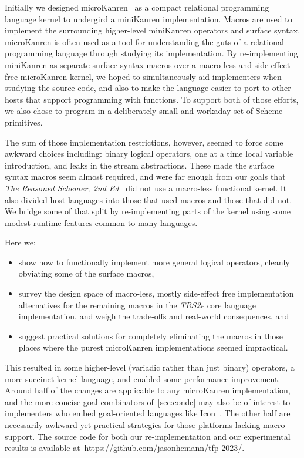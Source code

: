 \documentclass[sigplan,balance=true,pbalance=true,natbib=false]{acmart}
\begin{document}
Initially we designed microKanren~\cite{hemann2013muKanren} as a
compact relational programming language kernel to undergird a
miniKanren implementation. Macros are used to implement the
surrounding higher-level miniKanren operators and surface syntax.\@
microKanren is often used as a tool for understanding the guts of a
relational programming language through studying its implementation.
By re-implementing miniKanren as separate surface syntax macros over a
macro-less and side-effect free microKanren kernel, we hoped to
simultaneously aid implementers when studying the source code, and
also to make the language easier to port to other hosts that support
programming with functions. To support both of those efforts, we also
chose to program in a deliberately small and workaday set of Scheme
primitives.

The sum of those implementation restrictions, however, seemed to force
some awkward choices including: binary logical operators, one at a
time local variable introduction, and leaks in the stream
abstractions. These made the surface syntax macros seem almost
required, and were far enough from our goals that \emph{The Reasoned
  Schemer, 2nd Ed}~\cite{friedman2018reasoned} did not use a
macro-less functional kernel. It also divided host languages into
those that used macros and those that did not. We bridge some of that
split by re-implementing parts of the kernel using some modest runtime
features common to many languages.

Here we:
\begin{itemize}
\item show how to functionally implement more general logical
  operators, cleanly obviating some of the surface macros,

\item survey the design space of macro-less, mostly side-effect free
  implementation alternatives for the remaining macros in the
  \emph{TRS2e} core language implementation, and weigh the trade-offs
  and real-world consequences, and

\item suggest practical solutions for completely eliminating the
  macros in those places where the purest microKanren
  implementations seemed impractical.

\end{itemize}

This resulted in some higher-level (variadic rather than just binary)
operators, a more succinct kernel language, and enabled some
performance improvement. Around half of the changes are applicable to
any microKanren implementation, and the more concise goal combinators
of~\cref{sec:conde} may also be of interest to implementers who embed
goal-oriented languages like Icon~\cite{griswold1983icon}. The other
half are necessarily awkward yet practical strategies for those
platforms lacking macro support. The source code for both our
re-implementation and our experimental results is available
at~\url{https://github.com/jasonhemann/tfp-2023/}.
\end{document}
